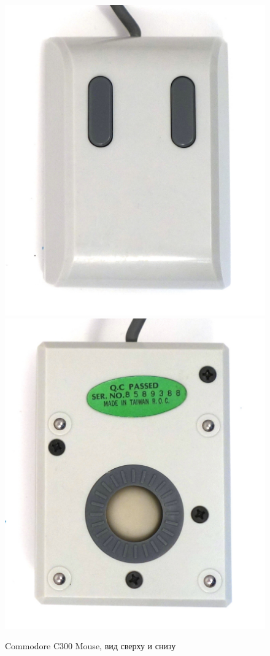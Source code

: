 \documentclass[11pt, a4paper]{article}
\begin{document}
\begin{figure}[h]
    \centering
    \includegraphics[scale=0.7]{1986_commodore_c300_mouse/3verh_60.jpg}
    \includegraphics[scale=0.7]{1986_commodore_c300_mouse/3niz_60.jpg}
    \caption{Commodore C300 Mouse, вид сверху и снизу}
    \label{fig:C300TopAndBottom}
\end{figure}
\end{document}
